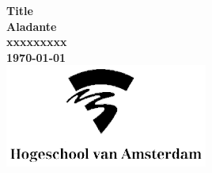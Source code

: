 \begin{titlepage}
	\centering
	\vfill
	{\bfseries\Huge
		Title\\
		\vskip2cm
	}
	{\bfseries\Large
		Aladante\\
	}
	{
		\bfseries\normalsize
		xxxxxxxxx\\
		\vskip1cm
		\today\\
	}
	\vfill
	\includegraphics[width=0.5\textwidth]{images/hva-logo.eps}
	\vfill
	\vfill
\end{titlepage}
\newpage
